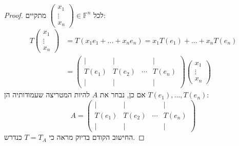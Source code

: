 \documentclass[12pt]{report}
\theoremstyle{plain}
\theoremstyle{definition}
\newcommand{\F}{\mathbb{F}}
\newcommand{\0}{\mathbf{0}}
\begin{document}
\begin{proof}
לכל 
$\begin{pmatrix}x_1\\\vdots\\x_n\end{pmatrix}\in\F^n$
מתקיים:
$$
\begin{aligned}
T\begin{pmatrix}x_1\\\vdots\\x_n\end{pmatrix}&=T(x_1e_1+...+x_ne_n)=x_1T(e_1)+...+x_nT(e_n)\\
&=\begin{pmatrix}
\mid & \mid &        & \mid \\
T(e_1) & T(e_2) & \cdots & T(e_n) \\
\mid & \mid &        & \mid
\end{pmatrix}\begin{pmatrix}x_1\\\vdots\\x_n\end{pmatrix}
\end{aligned}
$$
אם כן, נבחר את 
$A$
להיות המטריצה שעמודותיה הן
$T(e_1),...,T(e_n)$:
$$
A=\begin{pmatrix}
\mid & \mid &        & \mid \\
T(e_1) & T(e_2) & \cdots & T(e_n) \\
\mid & \mid &        & \mid
\end{pmatrix}
$$
החישוב הקודם בדיוק מראה כי
$T=T_A$
כנדרש.
\end{proof}
\end{document}
